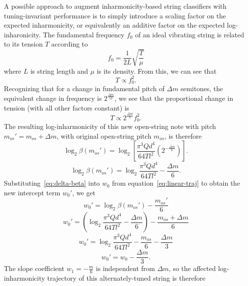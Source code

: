 \documentclass[12pt]{cmuthesis}
\begin{document}
A possible approach to augment inharmonicity-based string classifiers with tuning-invariant performance is to simply introduce a scaling factor on the expected inharmonicity, or equivalently an additive factor on the expected log-inharonicity. The fundamental frequency $f_0$ of an ideal vibrating string is related to its tension $T$ according to
\begin{equation}
f_0 = \frac{1}{2L}\sqrt{\frac{T}{\mu}}
\end{equation}
where $L$ is string length and $\mu$ is its density. From this, we can see that
\begin{equation}
T \propto f_0^{2}.
\end{equation}
Recognizing that for a change in fundamental pitch of $\Delta m$ semitones, the equivalent change in frequency is $2^{\frac{\Delta m}{12}}$, we see that the proportional change in tension (with all other factors constant) is
\begin{equation}
T \propto 2^{\frac{\Delta m}{6}}f_0^2.
\end{equation}
The resulting log-inharmonicity of this new open-string note with pitch $m_{os}' = m_{os}+\Delta m$, with original open-string pitch $m_{os}$, is therefore
\begin{equation}
\log_2\beta(m_{os}') = \log_2[ \frac{\pi^3 Q d^4}{64 T l^2}(2^{-\frac{\Delta m}{6}})].
\end{equation}
\begin{equation}
\label{eq:delta-beta}
\log_2\beta(m_{os}') = \log_2\frac{\pi^3 Q d^4}{64 T l^2} - \frac{\Delta m}{6}.
\end{equation}
Substituting~\eqref{eq:delta-beta} into $w_0$ from equation~\eqref{eq:linear-traj} to obtain the new intercept term $w_0'$, we get
\begin{equation}
w_{0}' = \log_2{\beta}(m_{os}') - \frac{m_{os}'}{6}
\end{equation}
\begin{equation}
w_{0}' = (\log_2\frac{\pi^3 Q d^4}{64 T l^2} - \frac{\Delta m}{6}) - \frac{m_{os}+\Delta m}{6}
\end{equation}
\begin{equation}
\label{eq:3.17}
w_{0}' = \log_2\frac{\pi^3 Q d^4}{64 T l^2} - \frac{m_{os}}{6} - \frac{\Delta m}{3}
\end{equation}
\begin{equation}
\label{eq:3.18}
w_{0}' = w_0 - \frac{\Delta m}{3}.
\end{equation}
The slope coefficient $w_1 = -\frac{m}{6}$ is independent from ${\Delta m}$, so the affected log-inharmonicity trajectory of this alternately-tuned string is therefore
\end{document}
